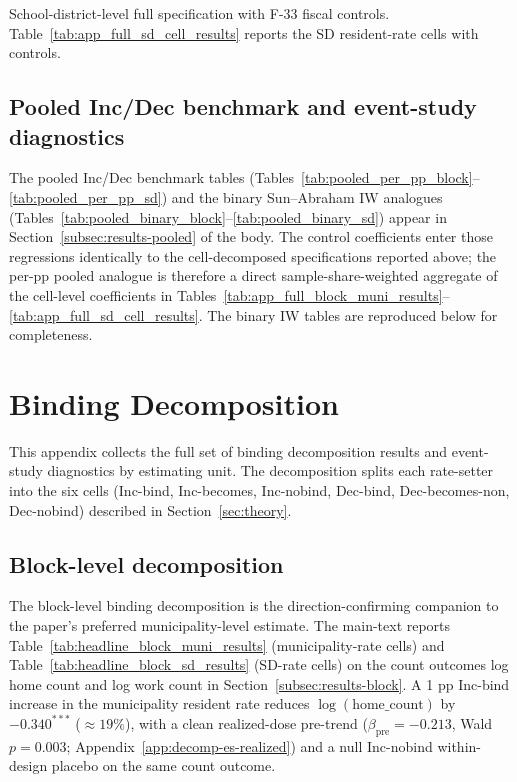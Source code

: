 \documentclass[12pt]{article}
\begin{document}
School-district-level full specification with F-33 fiscal
controls.
Table~\ref{tab:app_full_sd_cell_results} reports the SD
resident-rate cells with controls.



\subsection{Pooled Inc/Dec benchmark and event-study diagnostics}
\label{app:pooled}

The pooled Inc/Dec benchmark tables
(Tables~\ref{tab:pooled_per_pp_block}--\ref{tab:pooled_per_pp_sd})
and the binary Sun--Abraham IW analogues
(Tables~\ref{tab:pooled_binary_block}--\ref{tab:pooled_binary_sd})
appear in Section~\ref{subsec:results-pooled} of the body. The
control coefficients enter those regressions identically to the
cell-decomposed specifications reported above; the per-pp pooled
analogue is therefore a direct sample-share-weighted aggregate of
the cell-level coefficients in
Tables~\ref{tab:app_full_block_muni_results}--\ref{tab:app_full_sd_cell_results}.
The binary IW tables are reproduced below for completeness.







\section{Binding Decomposition}
\label{app:decomp}
\label{app:es-figures}

This appendix collects the full set of binding decomposition
results and event-study diagnostics by estimating unit. The
decomposition splits each rate-setter into the
six cells (Inc-bind, Inc-becomes, Inc-nobind, Dec-bind,
Dec-becomes-non, Dec-nobind) described in
Section~\ref{sec:theory}.

\subsection{Block-level decomposition}
\label{app:decomp-block}

The block-level binding decomposition is the direction-confirming
companion to the paper's preferred municipality-level estimate. The main-text reports
Table~\ref{tab:headline_block_muni_results} (municipality-rate cells) and
Table~\ref{tab:headline_block_sd_results} (SD-rate cells) on the
count outcomes log home count and log work count
in Section~\ref{subsec:results-block}. A 1 pp Inc-bind increase in
the municipality resident rate reduces $\log(\text{home\_count})$ by $-0.340^{***}$
($\approx 19\%$), with a clean realized-dose pre-trend
($\beta_{\text{pre}} = -0.213$, Wald $p=0.003$;
Appendix~\ref{app:decomp-es-realized}) and a null Inc-nobind
within-design placebo on the same count outcome.
\end{document}
